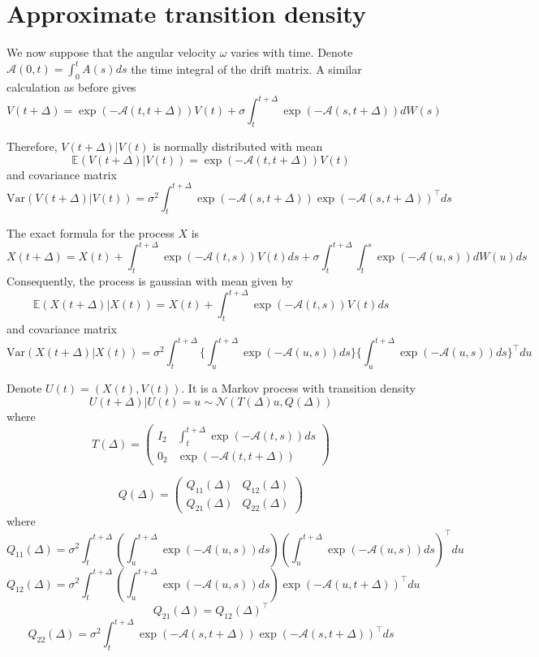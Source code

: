 \documentclass[aoas]{imsart}
\theoremstyle{definition}
\theoremstyle{remark}
\theoremstyle{remark}
\newcommand {\E}{\mathbb{E}}
\newcommand {\1}{\mathbb{1}}
\begin{document}
\section{Approximate transition density}

We now suppose that the angular velocity $\omega$ varies with time. Denote $\mathcal{A}(0,t)=\int_0^t A(s) ds$ the time integral of the drift matrix.
A similar calculation as before gives
\[V(t+\Delta)=\exp(-\mathcal{A}(t,t+\Delta)) V(t)+\sigma \int_t^{t+\Delta} \exp(-\mathcal{A}(s,t+\Delta)) dW(s)\]


Therefore, $V(t+\Delta) \vert V(t)$ is normally distributed with mean
\[\E(V(t+\Delta) \vert V(t))=\exp(-\mathcal{A}(t,t+\Delta)) V(t)\]
and covariance matrix 
\[\mbox{Var}(V(t+\Delta) \vert V(t))=\sigma^2\int_t^{t+\Delta} \exp(-\mathcal{A}(s,t+\Delta)) \exp(-\mathcal{A}(s,t+\Delta))^\top ds\]


The exact formula for the process $X$ is 
\[X(t+\Delta)=X(t)+\int_t^{t+\Delta} \exp(-\mathcal{A}(t,s)) V(t) ds +\sigma \int_t^{t+\Delta} \int_t^s \exp(-\mathcal{A}(u,s)) dW(u) ds \]
Consequently, the process is gaussian with mean given by
\[\E(X(t+\Delta) \vert X(t))=X(t)+\int_t^{t+\Delta} \exp(-\mathcal{A}(t,s)) V(t) ds\]
and covariance matrix 
\[\mbox{Var}(X(t+\Delta) \vert X(t))=\sigma^2 \int_t^{t+\Delta} \lbrace \int_u^{t+\Delta} \exp(-\mathcal{A}(u,s))ds \rbrace \lbrace \int_u^{t+\Delta} \exp(-\mathcal{A}(u,s)) ds \rbrace^\top du\]

Denote $U(t)=(X(t), V(t))$. It is a Markov process with transition density
\[U(t+\Delta) \vert U(t)=u \sim \mathcal{N}(T(\Delta) u, Q(\Delta))\]
where 
\begin{equation}
	T(\Delta) = \begin{pmatrix}
		I_2 & \int_t^{t+\Delta} \exp(-\mathcal{A}(t,s)) ds \\
		0_2 & \exp(-\mathcal{A}(t,t+\Delta))
	\end{pmatrix}
\end{equation}

\begin{equation}
	Q(\Delta) = \begin{pmatrix}
		
		Q_{11}(\Delta) & Q_{12}(\Delta)  \\
		Q_{21}(\Delta) &  Q_{22}(\Delta)
	\end{pmatrix}
\end{equation}
where 
\[Q_{11}(\Delta)=\sigma^2 \int_{t}^{t+\Delta} \left( \int_{u}^{t+\Delta} \exp(-\mathcal{A}(u,s)) ds \right) \left( \int_{u}^{t+\Delta} \exp(-\mathcal{A}(u,s)) ds \right)^\top du \]
\[Q_12(\Delta)=\sigma^2 \int_{t}^{t+\Delta} \left( \int_{u}^{t+\Delta} \exp(-\mathcal{A}(u,s)) ds \right) \exp(-\mathcal{A}(u,t+\Delta))^\top du\]
\[Q_{21}(\Delta)=Q_{12}(\Delta)^\top\]
\[Q_{22}(\Delta)=\sigma^2 \int_t^{t+\Delta} \exp(-\mathcal{A}(s,t+\Delta)) \exp(-\mathcal{A}(s,t+\Delta))^\top ds\]
\end{document}
